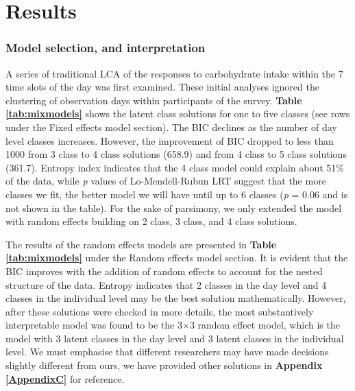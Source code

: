 
\chapter{Results} %

\label{Chapter 3} %


\vspace{-0.7cm}


\subsection{Model selection, and interpretation}\vspace{-0.4cm}

A series of traditional LCA of the responses to carbohydrate intake within the 7 time slots of the day was first examined. These initial analyses ignored the clustering of observation days within participants of the survey. \textbf{Table \ref{tab:mixmodels}} shows the latent class solutions for one to five classes (see rows under the Fixed effects model section). The BIC declines as the number of day level classes increases. However, the improvement of BIC dropped to less than 1000 from 3 class to 4 class solutions (658.9) and from 4 class to 5 class solutions (361.7). Entropy index indicates that the 4 class model could explain about 51\% of the data, while \textit{p} values of Lo-Mendell-Rubun LRT suggest that the more classes we fit, the better model we will have until up to 6 classes (\textit{p} = 0.06 and is not shown in the table). For the sake of parsimony, we only extended the model with random effects building on 2 class, 3 class, and 4 class solutions. 

The results of the random effects models are presented in \textbf{Table \ref{tab:mixmodels}} under the Random effects model section. It is evident that the BIC improves with the addition of random effects to account for the nested structure of the data. Entropy indicates that 2 classes in the day level and 4 classes in the individual level may be the best solution mathematically. However, after these solutions were checked in more details, the most substantively interpretable model was found to be the 3$\times$3 random effect model, which is the model with 3 latent classes in the day level and 3 latent classes in the individual level. We must emphasise that different researchers may have made decisions slightly different from ours, we have provided other solutions in \textbf{Appendix \ref{AppendixC}} for reference. 

